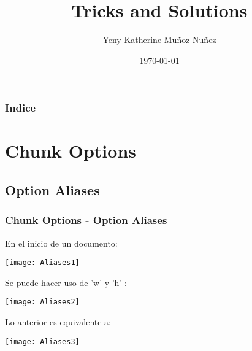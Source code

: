 \documentclass[11pt]{beamer}					%
\begin{document}
	
		\title[Titulo Corto]{Tricks and Solutions}
		\author{Yeny Katherine Muñoz Nuñez}
		\date{\today}

		\begin{frame}
			\titlepage 
		\end{frame}
	
     	\begin{frame}
		\frametitle{Indice}	
		\tableofcontents
		\end{frame}
	
\section{Chunk Options}
	
	\subsection{Option Aliases}
		\begin{frame}
			\frametitle{Chunk Options - Option Aliases}
				\begin{block}{En el inicio de un documento:}
					\begin{small}
						\begin{center}
						\texttt{[image: Aliases1]} 
						\end{center}
					\end{small}
				\end{block}
				\begin{block}{Se puede hacer uso de 'w' y 'h' :}
					\begin{small}
						\begin{center}
						\texttt{[image: Aliases2]} 
						\end{center}
					\end{small}
				\end{block}
				\begin{block}{Lo anterior es equivalente a:}
					\begin{small}
						\begin{center}
						\texttt{[image: Aliases3]} 
						\end{center}
					\end{small}
				\end{block}
		\end{frame}
\end{document}
